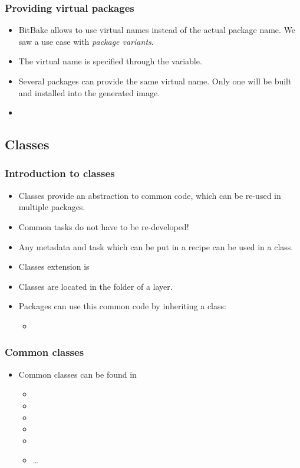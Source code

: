 \begin{frame}
  \frametitle{Providing virtual packages}
  \begin{itemize}
    \item BitBake allows to use virtual names instead of the actual
          package name. We saw a use case with \emph{package
          variants}.
    \item The virtual name is specified through the 
          variable.
    \item Several packages can provide the same virtual name. Only one
          will be built and installed into the generated image.
    \item {}
  \end{itemize}
\end{frame}

\subsection{Classes}

\begin{frame}
  \frametitle{Introduction to classes}
  \begin{itemize}
    \item Classes provide an abstraction to common code, which can be
          re-used in multiple packages.
    \item Common tasks do not have to be re-developed!
    \item Any metadata and task which can be put in a recipe can be
          used in a class.
    \item Classes extension is 
    \item Classes are located in the  folder of a layer.
    \item Packages can use this common code by inheriting a class:
    \begin{itemize}
      \item {}
    \end{itemize}
  \end{itemize}
\end{frame}

\begin{frame}
  \frametitle{Common classes}
  \begin{itemize}
    \item Common classes can be found in 
    \begin{itemize}
      \item {}
      \item {}
      \item {}
      \item {}
      \item {}
      \item \dots
    \end{itemize}
  \end{itemize}
\end{frame}

